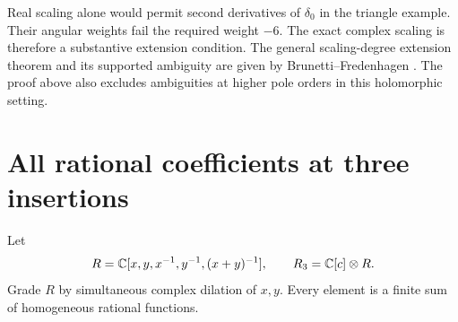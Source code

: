 Real scaling alone would permit second derivatives of $\delta_0$ in the
triangle example.  Their angular weights fail the required weight $-6$.
The exact complex scaling is therefore a substantive extension condition.
The general scaling-degree extension theorem and its supported ambiguity
are given by Brunetti--Fredenhagen \cite[Theorems 5.2--5.3, pp.~23--24]{BF1999}.
The proof above also excludes ambiguities at higher pole orders in this
holomorphic setting.

\section{All rational coefficients at three insertions}

Let
\[
 R=\mathbb C[x,y,x^{-1},y^{-1},(x+y)^{-1}],\qquad
 R_3=\mathbb C[c]\otimes R.
\]
Grade $R$ by simultaneous complex dilation of $x,y$.
Every element is a finite sum of homogeneous rational functions.

